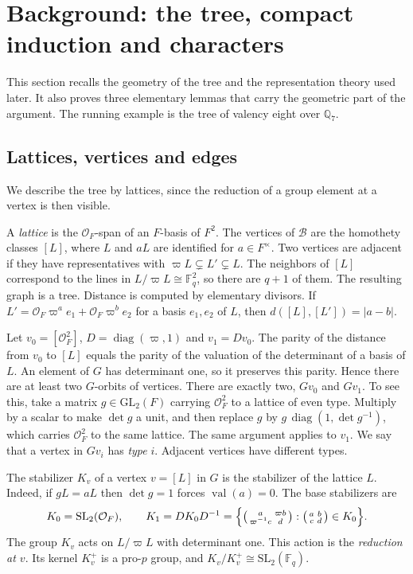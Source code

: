 \documentclass[12pt,letterpaper]{article}
\numberwithin{equation}{section}
\theoremstyle{definition}
\theoremstyle{remark}
\newcommand{\OO}{\mathcal O_F}
\newcommand{\kk}{\mathbb F_q}
\newcommand{\val}{\operatorname{val}}
\newcommand{\diag}{\operatorname{diag}}
\newcommand{\BT}{\mathscr B}
\newcommand{\sm}[4]{\left(\begin{smallmatrix}#1&#2\\#3&#4\end{smallmatrix}\right)}
\begin{document}
\section{Background: the tree, compact induction and characters}\label{sec:background}
This section recalls the geometry of the tree and the representation theory used later. It also proves three elementary lemmas that carry the geometric part of the argument. The running example is the tree of valency eight over $\mathbb Q_7$.

\subsection{Lattices, vertices and edges}
We describe the tree by lattices, since the reduction of a group element at a vertex is then visible.

A \emph{lattice} is the $\OO$-span of an $F$-basis of $F^2$. The vertices of $\BT$ are the homothety classes $[L]$, where $L$ and $aL$ are identified for $a\in F^\times$. Two vertices are adjacent if they have representatives with $\varpi L\subsetneq L'\subsetneq L$. The neighbors of $[L]$ correspond to the lines in $L/\varpi L\cong\kk^2$, so there are $q+1$ of them. The resulting graph is a tree. Distance is computed by elementary divisors. If $L'=\OO\varpi^a e_1+\OO\varpi^b e_2$ for a basis $e_1,e_2$ of $L$, then $d([L],[L'])=|a-b|$.

Let $v_0=[\OO^2]$, $D=\diag(\varpi,1)$ and $v_1=Dv_0$. The parity of the distance from $v_0$ to $[L]$ equals the parity of the valuation of the determinant of a basis of $L$. An element of $G$ has determinant one, so it preserves this parity. Hence there are at least two $G$-orbits of vertices. There are exactly two, $Gv_0$ and $Gv_1$. To see this, take a matrix $g\in\mathrm{GL}_2(F)$ carrying $\OO^2$ to a lattice of even type. Multiply by a scalar to make $\det g$ a unit, and then replace $g$ by $g\,\diag(1,\det g^{-1})$, which carries $\OO^2$ to the same lattice. The same argument applies to $v_1$. We say that a vertex in $Gv_i$ has \emph{type} $i$. Adjacent vertices have different types.

The stabilizer $K_v$ of a vertex $v=[L]$ in $G$ is the stabilizer of the lattice $L$. Indeed, if $gL=aL$ then $\det g=1$ forces $\val(a)=0$. The base stabilizers are
\begin{equation}\label{eq:ki}
 K_0=\mathrm{SL}_2(\OO),\qquad K_1=DK_0D^{-1}
 =\Bigl\{\sm{a}{\varpi b}{\varpi^{-1}c}{d}:\sm abcd\in K_0\Bigr\}.
\end{equation}
The group $K_v$ acts on $L/\varpi L$ with determinant one. This action is the \emph{reduction at $v$}. Its kernel $K_v^+$ is a pro-$p$ group, and $K_v/K_v^+\cong\mathrm{SL}_2(\kk)$.
\end{document}

